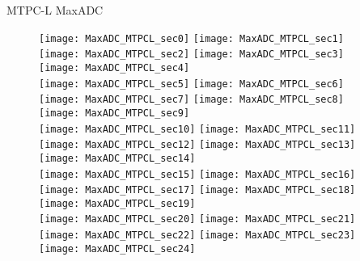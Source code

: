 \documentclass[11pt]{beamer}
\begin{document}
\begin{frame}{MTPC-L MaxADC}
\begin{figure}
\texttt{[image: MaxADC\_MTPCL\_sec0]}
\texttt{[image: MaxADC\_MTPCL\_sec1]}
\texttt{[image: MaxADC\_MTPCL\_sec2]}
\texttt{[image: MaxADC\_MTPCL\_sec3]}
\texttt{[image: MaxADC\_MTPCL\_sec4]}\\
\texttt{[image: MaxADC\_MTPCL\_sec5]}
\texttt{[image: MaxADC\_MTPCL\_sec6]}
\texttt{[image: MaxADC\_MTPCL\_sec7]}
\texttt{[image: MaxADC\_MTPCL\_sec8]}
\texttt{[image: MaxADC\_MTPCL\_sec9]}\\
\texttt{[image: MaxADC\_MTPCL\_sec10]}
\texttt{[image: MaxADC\_MTPCL\_sec11]}
\texttt{[image: MaxADC\_MTPCL\_sec12]}
\texttt{[image: MaxADC\_MTPCL\_sec13]}
\texttt{[image: MaxADC\_MTPCL\_sec14]}\\
\texttt{[image: MaxADC\_MTPCL\_sec15]}
\texttt{[image: MaxADC\_MTPCL\_sec16]}
\texttt{[image: MaxADC\_MTPCL\_sec17]}
\texttt{[image: MaxADC\_MTPCL\_sec18]}
\texttt{[image: MaxADC\_MTPCL\_sec19]}\\
\texttt{[image: MaxADC\_MTPCL\_sec20]}
\texttt{[image: MaxADC\_MTPCL\_sec21]}
\texttt{[image: MaxADC\_MTPCL\_sec22]}
\texttt{[image: MaxADC\_MTPCL\_sec23]}
\texttt{[image: MaxADC\_MTPCL\_sec24]}
\end{figure}
\end{frame}
\end{document}

